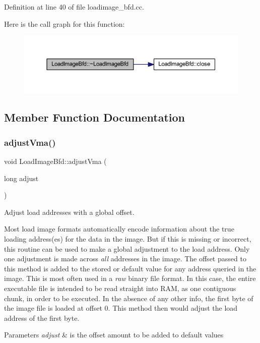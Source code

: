 Definition at line 40 of file loadimage\+\_\+bfd.\+cc.

Here is the call graph for this function\+:
\nopagebreak
\begin{figure}[H]
\begin{center}
\leavevmode
\includegraphics[width=350pt]{class_load_image_bfd_a449f33ca39e93b36288d2b45c18831d8_cgraph}
\end{center}
\end{figure}


\subsection{Member Function Documentation}
\mbox{\label{class_load_image_bfd_a92442c79bbcb55ef602bd9cb092da87e}} 
\subsubsection{\texorpdfstring{adjustVma()}{adjustVma()}}
{\footnotesize\ttfamily void Load\+Image\+Bfd\+::adjust\+Vma (\begin{DoxyParamCaption}\item[{long}]{adjust }\end{DoxyParamCaption})\hspace{0.3cm}{\ttfamily [virtual]}}



Adjust load addresses with a global offset. 

Most load image formats automatically encode information about the true loading address(es) for the data in the image. But if this is missing or incorrect, this routine can be used to make a global adjustment to the load address. Only one adjustment is made across {\itshape all} addresses in the image. The offset passed to this method is added to the stored or default value for any address queried in the image. This is most often used in a {\itshape raw} binary file format. In this case, the entire executable file is intended to be read straight into R\+AM, as one contiguous chunk, in order to be executed. In the absence of any other info, the first byte of the image file is loaded at offset 0. This method then would adjust the load address of the first byte. 
\begin{DoxyParams}{Parameters}
{\em adjust} & is the offset amount to be added to default values \\
\hline
\end{DoxyParams}


